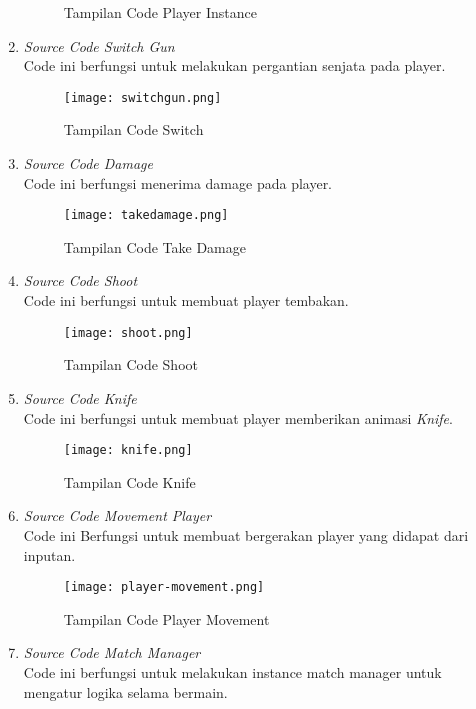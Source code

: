 \begin{enumerate}
\begin{figure}[h]
        \caption{Tampilan Code Player Instance}
        \label{fig:playerinstance}
    \end{figure}
    \item \textit{Source Code Switch Gun} \\ 
    Code ini berfungsi untuk melakukan pergantian senjata pada player.
    \begin{figure}[h]
        \centering
        \texttt{[image: switchgun.png]}
        \caption{Tampilan Code Switch}
        \label{fig:switchgun}
    \end{figure}
    \item \textit{Source Code Damage} \\
    Code ini berfungsi menerima damage pada player.
    \newpage
    \begin{figure}[h]
        \centering
        \texttt{[image: takedamage.png]}
        \caption{Tampilan Code Take Damage}
        \label{fig:takedamage}
    \end{figure}
    \item \textit{Source Code Shoot} \\ 
    Code ini berfungsi untuk membuat player tembakan.
    \begin{figure}[h]
        \centering
        \texttt{[image: shoot.png]}
        \caption{Tampilan Code Shoot}
        \label{fig:shoot}
    \end{figure}
    \newpage
    \item \textit{Source Code Knife} \\ 
    Code ini berfungsi untuk membuat player memberikan animasi \textit{Knife}.
    \begin{figure}[h]
        \centering
        \texttt{[image: knife.png]}
        \caption{Tampilan Code Knife}
        \label{fig:knife}
    \end{figure}
    \item \textit{Source Code Movement Player} \\ 
    Code ini Berfungsi untuk membuat bergerakan player yang didapat dari inputan.
    \begin{figure}[h]
        \centering
        \texttt{[image: player-movement.png]}
        \caption{Tampilan Code Player Movement}
        \label{fig:movementp}
    \end{figure}
    \item \textit{Source Code Match Manager} \\
    Code ini berfungsi untuk melakukan instance match manager untuk mengatur logika selama bermain.

\end{enumerate}
